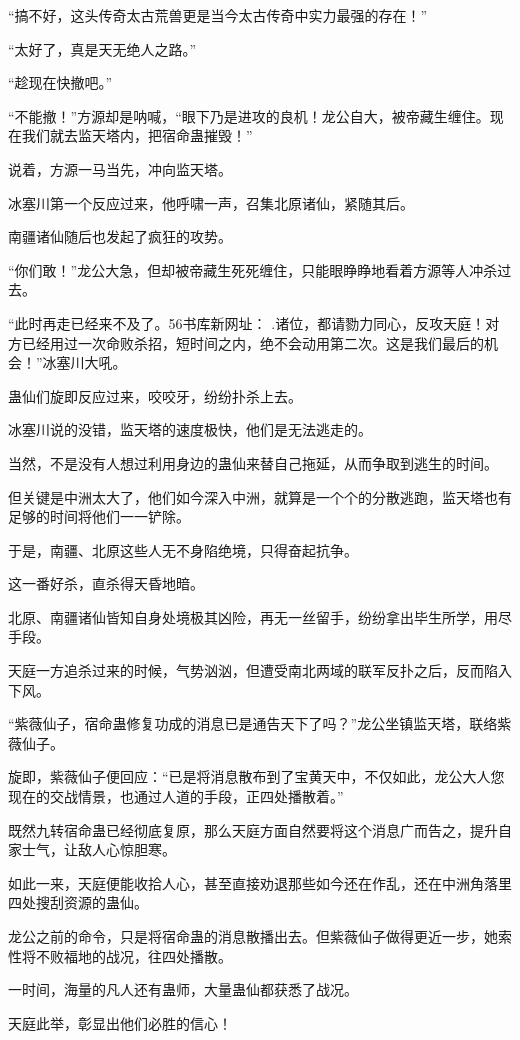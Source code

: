 \begin{this_body}
“搞不好，这头传奇太古荒兽更是当今太古传奇中实力最强的存在！”

“太好了，真是天无绝人之路。”

“趁现在快撤吧。”

“不能撤！”方源却是呐喊，“眼下乃是进攻的良机！龙公自大，被帝藏生缠住。现在我们就去监天塔内，把宿命蛊摧毁！”

说着，方源一马当先，冲向监天塔。

冰塞川第一个反应过来，他呼啸一声，召集北原诸仙，紧随其后。

南疆诸仙随后也发起了疯狂的攻势。

“你们敢！”龙公大急，但却被帝藏生死死缠住，只能眼睁睁地看着方源等人冲杀过去。

“此时再走已经来不及了。56书库新网址： .诸位，都请勠力同心，反攻天庭！对方已经用过一次命败杀招，短时间之内，绝不会动用第二次。这是我们最后的机会！”冰塞川大吼。

蛊仙们旋即反应过来，咬咬牙，纷纷扑杀上去。

冰塞川说的没错，监天塔的速度极快，他们是无法逃走的。

当然，不是没有人想过利用身边的蛊仙来替自己拖延，从而争取到逃生的时间。

但关键是中洲太大了，他们如今深入中洲，就算是一个个的分散逃跑，监天塔也有足够的时间将他们一一铲除。

于是，南疆、北原这些人无不身陷绝境，只得奋起抗争。

这一番好杀，直杀得天昏地暗。

北原、南疆诸仙皆知自身处境极其凶险，再无一丝留手，纷纷拿出毕生所学，用尽手段。

天庭一方追杀过来的时候，气势汹汹，但遭受南北两域的联军反扑之后，反而陷入下风。

“紫薇仙子，宿命蛊修复功成的消息已是通告天下了吗？”龙公坐镇监天塔，联络紫薇仙子。

旋即，紫薇仙子便回应：“已是将消息散布到了宝黄天中，不仅如此，龙公大人您现在的交战情景，也通过人道的手段，正四处播散着。”

既然九转宿命蛊已经彻底复原，那么天庭方面自然要将这个消息广而告之，提升自家士气，让敌人心惊胆寒。

如此一来，天庭便能收拾人心，甚至直接劝退那些如今还在作乱，还在中洲角落里四处搜刮资源的蛊仙。

龙公之前的命令，只是将宿命蛊的消息散播出去。但紫薇仙子做得更近一步，她索性将不败福地的战况，往四处播散。

一时间，海量的凡人还有蛊师，大量蛊仙都获悉了战况。

天庭此举，彰显出他们必胜的信心！


\end{this_body}
